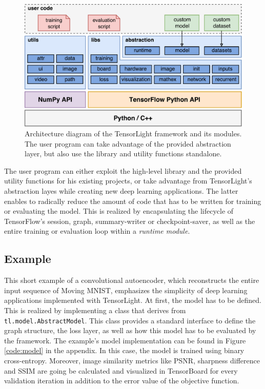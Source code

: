 \begin{figure}[htpb]
	\centering
	\includegraphics[width=0.8\linewidth]{figures/tensorlight_v3.pdf} 
	\caption[TensorLight Framework Architecture]{Architecture diagram of the TensorLight framework and its modules. The user program can take advantage of the provided abstraction layer, but also use the library and utility functions standalone.} \label{fig:tl_arch}
\end{figure}

The user program can either exploit the high-level library and the provided utility functions for his existing projects, or take advantage from TensorLight's abstraction layes while creating new deep learning applications. The latter enables to radically reduce the amount of code that has to be written for training or evaluating the model. This is realized by encapsulating the lifecycle of TensorFlow's session, graph, summary-writer or checkpoint-saver, as well as the entire training or evaluation loop within a \textit{runtime module}.


\subsection{Example}

This short example of a convolutional autoencoder, which reconstructs the entire input sequence of Moving MNIST, emphasizes the simplicity of deep learning applications implemented with TensorLight. At first, the model has to be defined. This is realized by implementing a class that derives from \texttt{tl.model.AbstractModel}. This class provides a standard interface to define the graph structure, the loss layer, as well as how this model has to be evaluated by the framework. The example's model implementation can be found in Figure \ref{code:model} in the appendix. In this case, the model is trained using binary cross-entropy. Moreover, image similarity metrics like PSNR, sharpness difference and SSIM are going be calculated and visualized in TensorBoard for every validation iteration in addition to the error value of the objective function.

